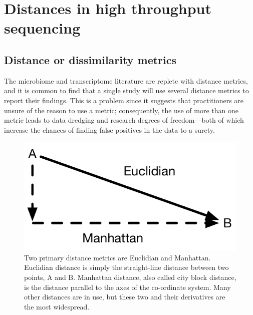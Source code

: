 \documentclass[
  onecolumn]{article}
\begin{document}
\hypertarget{distances}{%
\section{Distances in high throughput sequencing}\label{distances}}

\hypertarget{distance-or-dissimilarity-metrics}{%
\subsection{Distance or dissimilarity metrics}\label{distance-or-dissimilarity-metrics}}

The microbiome and transcriptome literature are replete with distance metrics, and it is common to find that a single study will use several distance metrics to report their findings. This is a problem since it suggests that practitioners are unsure of the reason to use a metric; consequently, the use of more than one metric leads to data dredging and research degrees of freedom---both of which increase the chances of finding false positives in the data to a surety.

\begin{figure}
\centering
\includegraphics{./figs/distance.pdf}
\caption{Two primary distance metrics are Euclidian and Manhattan. Euclidian distance is simply the straight-line distance between two points, A and B. Manhattan distance, also called city block distance, is the distance parallel to the axes of the co-ordinate system. Many other distances are in use, but these two and their derivatives are the most widespread.}
\end{figure}
\end{document}
